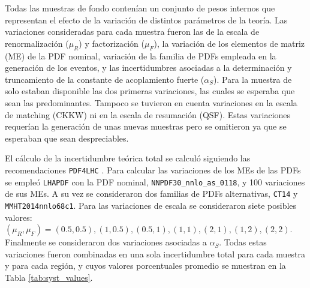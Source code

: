 Todas las muestras de fondo contenían un conjunto de pesos internos que representan el efecto de la variación de distintos parámetros de la teoría. Las variaciones consideradas para cada muestra fueron las de la escala de renormalización ($\mu_R$) y factorización ($\mu_F$), la variación de los elementos de matriz (ME) de la PDF nominal, variación de la familia de PDFs empleada en la generación de los eventos, y las incertidumbres asociadas a la determinación y truncamiento de la constante de acoplamiento fuerte ($\alpha_S$). Para la muestra de \ttbarph solo estaban disponible las dos primeras variaciones, las cuales se esperaba que sean las predominantes. Tampoco se tuvieron en cuenta variaciones en la escala de matching (CKKW)  ni en la escala de resumación (QSF). Estas variaciones requerían la generación de unas nuevas muestras pero se omitieron ya que se esperaban que sean despreciables. 

El cálculo de la incertidumbre teórica total se calculó siguiendo las recomendaciones \texttt{PDF4LHC} . Para calcular las variaciones de los MEs de las PDFs se empleó \texttt{LHAPDF} \cite{lhapdf} con la PDF nominal, \texttt{NNPDF30\_nnlo\_as\_0118}, y 100 variaciones de sus MEs. A su vez se consideraron dos familias de PDFs alternativas, \texttt{CT14} y \texttt{MMHT2014nnlo68c1}. Para las variaciones de escala se consideraron siete posibles valores: $(\mu_R, \mu_F) = (0.5,0.5), (1,0.5), (0.5,1), (1,1), (2,1), (1,2), (2,2)$. Finalmente se consideraron dos variaciones asociadas a $\alpha_S$. Todas estas variaciones fueron combinadas en una sola incertidumbre total para cada muestra y para cada región, y cuyos valores porcentuales promedio se muestran en la Tabla \ref{tab:syst_values}.

